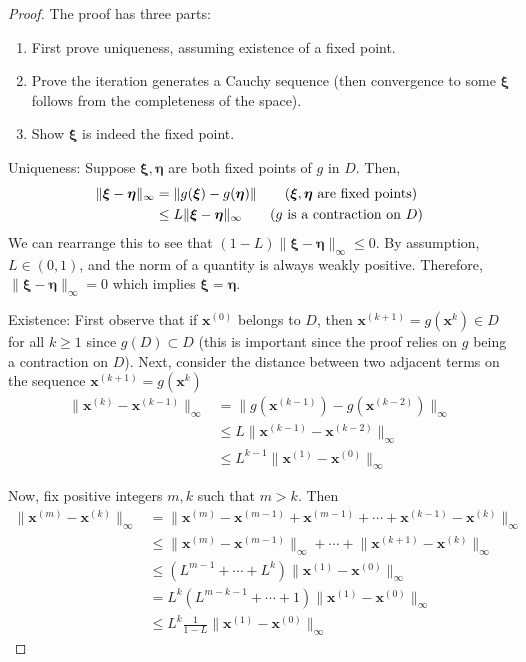 \documentclass[12pt]{article}
\theoremstyle{definition}
\newcommand{\norm}[1]{\lVert#1\rVert}
\newcommand{\x}{\bm{x}}
\newcommand{\xib}{\bm{\xi}}
\begin{document}
\begin{proof}
The proof has three parts:
\begin{enumerate}
	\item First prove uniqueness, assuming existence of a fixed point.
	\item Prove the iteration generates a Cauchy sequence (then convergence to some $\xib$ follows from the completeness of the space).
	\item Show $\xib$ is indeed the fixed point.
\end{enumerate}

Uniqueness: Suppose $\xib, \bm \eta$ are both fixed points of $g$ in $D$. Then,
\begin{align*}
	\norm{\xib - \bm \eta}_\infty &= \norm{g(\xib) - g(\bm \eta)} \tag{$\xib, \bm \eta$ are fixed points} \\
	&\leq L \norm{\xib - \bm \eta}_\infty \tag{$g$ is a contraction on $D$}
\end{align*}
We can rearrange this to see that $(1-L)\norm{\xib - \bm \eta}_\infty \leq 0$. By assumption, $L\in (0,1)$, and the norm of a quantity is always weakly positive. Therefore, $\norm{\xib - \bm \eta}_\infty = 0$ which implies $\xib = \bm \eta$. 

Existence: First observe that if $\x^{(0)}$ belongs to $D$, then $\x^{(k+1)} = g(\x^{k}) \in D$ for all $k \geq 1$ since $g(D) \subset D$ (this is important since the proof relies on $g$ being a contraction on $D$). Next, consider the distance between two adjacent terms on the sequence $\x^{(k+1)} = g(\x^{k})$
\begin{align*}
	\norm{\x^{(k)} - \x^{(k-1)}}_\infty &= \norm{g(\x^{(k-1)}) - g(\x^{(k-2)})}_\infty \tag{definition of $g$} \\
	&\leq L \norm{\x^{(k-1)} - \x^{(k-2)}}_\infty \tag{$g$ is a contraction on $D$} \\
	&\leq L^{k-1} \norm{\x^{(1)} - \x^{(0)}}_\infty \tag{induction}
\end{align*}

Now, fix positive integers $m,k$ such that $m > k$. Then
\begin{align*}
	\norm{\x^{(m)} - \x^{(k)}}_\infty &= \norm{\x^{(m)} - \x^{(m-1)} + \x^{(m-1)} + \cdots + \x^{(k-1)} - \x^{(k)}}_\infty \\
	&\leq \norm{\x^{(m)} - \x^{(m-1)}}_\infty + \cdots + \norm{\x^{(k+1)} - \x^{(k)}}_\infty \tag{triangle inequality} \\
	&\leq (L^{m-1} + \cdots + L^k) \norm{\x^{(1)} - \x^{(0)}}_\infty \\
	&= L^k (L^{m-k-1} + \cdots + 1) \norm{\x^{(1)} - \x^{(0)}}_\infty \\
	&\leq L^k \frac{1}{1-L} \norm{\x^{(1)} - \x^{(0)}}_\infty \tag{geometric series}
\end{align*}


\end{proof}
\end{document}
